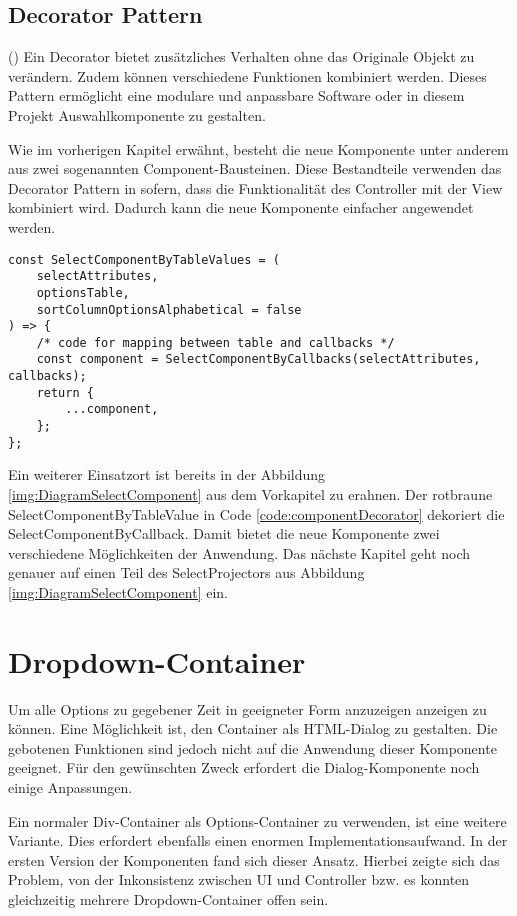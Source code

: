 \subsection{Decorator Pattern}

(\cite{decoratorPattern}) Ein Decorator bietet zusätzliches Verhalten ohne das Originale Objekt zu verändern.
Zudem können verschiedene Funktionen kombiniert werden.
Dieses Pattern ermöglicht eine modulare und anpassbare Software oder in diesem Projekt Auswahlkomponente zu gestalten.

Wie im vorherigen Kapitel erwähnt, besteht die neue Komponente unter anderem aus zwei sogenannten Component-Bausteinen.
Diese Bestandteile verwenden das Decorator Pattern in sofern, dass die Funktionalität des Controller mit der View kombiniert wird.
Dadurch kann die neue Komponente einfacher angewendet werden.

\begin{lstlisting}[style = htmlcssjs, caption = SelectComponentByTableValue dekoriert SelectComponentByCallback, label = code:componentDecorator]
const SelectComponentByTableValues = (
    selectAttributes,
    optionsTable,
    sortColumnOptionsAlphabetical = false
) => {
    /* code for mapping between table and callbacks */
    const component = SelectComponentByCallbacks(selectAttributes, callbacks);
    return {
        ...component,
    };
};
\end{lstlisting}

Ein weiterer Einsatzort ist bereits in der Abbildung \ref{img:DiagramSelectComponent} aus dem Vorkapitel zu erahnen.
Der rotbraune SelectComponentByTableValue in Code \ref{code:componentDecorator} dekoriert die SelectComponentByCallback.
Damit bietet die neue Komponente zwei verschiedene Möglichkeiten der Anwendung.
Das nächste Kapitel geht noch genauer auf einen Teil des SelectProjectors aus Abbildung \ref{img:DiagramSelectComponent} ein.


\section{Dropdown-Container}

Um alle Options zu gegebener Zeit in geeigneter Form anzuzeigen anzeigen zu können.
Eine Möglichkeit ist, den Container als HTML-Dialog zu gestalten.
Die gebotenen Funktionen sind jedoch nicht auf die Anwendung dieser Komponente geeignet.
Für den gewünschten Zweck erfordert die Dialog-Komponente noch einige Anpassungen.

Ein normaler Div-Container als Options-Container zu verwenden, ist eine weitere Variante.
Dies erfordert ebenfalls einen enormen Implementationsaufwand.
In der ersten Version der Komponenten fand sich dieser Ansatz.
Hierbei zeigte sich das Problem, von der Inkonsistenz zwischen UI und Controller bzw. es konnten gleichzeitig mehrere Dropdown-Container offen sein.

